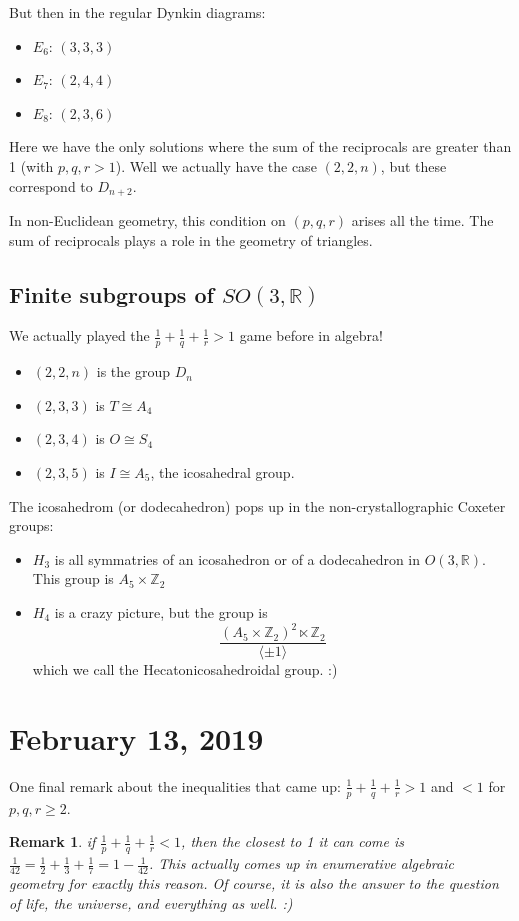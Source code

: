 \documentclass[12pt]{article}
\theoremstyle{nonumberbreak}
\theoremstyle{changebreak}
\theoremstyle{nonumberbreak}
\theoremstyle{change}
\newtheorem{rmk}[thm]{Remark}
\newcommand*{\Z}{
\mathbb{Z}
}
\newcommand*{\R}{
\mathbb{R}
}
\begin{document}
But then in the regular Dynkin diagrams:
\begin{itemize}
	\item $E_6$: $(3,3,3)$
	\item $E_7$: $(2,4,4)$
	\item $E_8$: $(2,3,6)$
\end{itemize}
Here we have the only solutions where the sum of the reciprocals are greater than 1 (with $p,q,r>1$). 
Well we actually have the case $(2,2,n)$, but these correspond to $D_{n+2}$.

In non-Euclidean geometry, this condition on $(p,q,r)$ arises all the time. The sum of reciprocals plays a role in the geometry of triangles.

\subsection{Finite subgroups of $SO(3,\R)$}
We actually played the $\frac{1}{p}+\frac{1}{q}+\frac{1}{r}>1$ game before in algebra!
\begin{itemize}
	\item $(2,2,n)$ is the group $D_n$
	\item $(2,3,3)$ is $T\cong A_4$
	\item $(2,3,4)$ is $O\cong S_4$
	\item $(2,3,5)$ is $I\cong A_5$, the icosahedral group.
\end{itemize}

The icosahedrom (or dodecahedron) pops up in the non-crystallographic Coxeter groups:
\begin{itemize}
	\item $H_3$ is all symmatries of an icosahedron or of a dodecahedron in $O(3,\R)$. This group is $A_5\times\Z_2$
	\item $H_4$ is a crazy picture, but the group is
	\[\frac{(A_5\times \Z_2)^2\ltimes \Z_2}{\langle \pm 1\rangle}\]
	which we call the Hecatonicosahedroidal group. :)
\end{itemize}

\section{February 13, 2019}
One final remark about the inequalities that came up: $\frac{1}{p}+\frac{1}{q}+\frac{1}{r}>1$ and $<1$ for $p,q,r\ge 2$.

\begin{rmk}
	if $\frac{1}{p}+\frac{1}{q}+\frac{1}{r}<1$, then the closest to 1 it can come is $\frac{1}{42}=\frac{1}{2}+\frac{1}{3}+\frac{1}{7}=1-\frac{1}{42}$.
	This actually comes up in enumerative algebraic geometry for exactly this reason. Of course, it is also the
	answer to the question of life, the universe, and everything as well. :)
\end{rmk}
\end{document}
